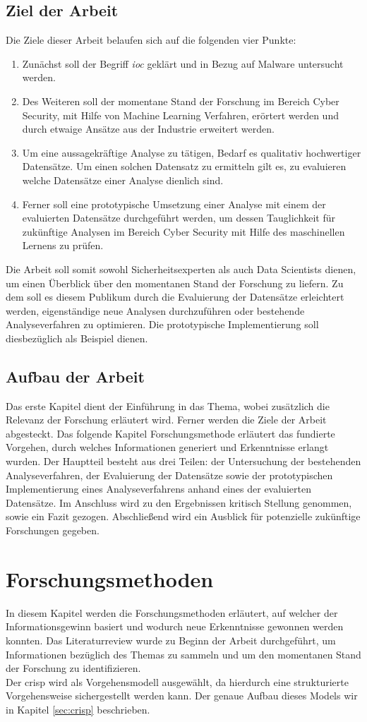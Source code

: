 \documentclass[
    12pt, %
    DIV10,
    ngerman, %
    a4paper, %
    oneside, %
    titlepage, %
    parskip=half, %
    headings=normal, %
    listof=totoc, %
    bibliography=totoc, %
    index=totoc, %
    captions=tableheading, %
    final %
]{scrreprt}
\begin{document}
\section{Ziel der Arbeit}
Die Ziele dieser Arbeit belaufen sich auf die folgenden vier Punkte:
\begin{enumerate}
\item Zunächst soll der Begriff \emph{\acl{ioc}} geklärt und in Bezug auf Malware untersucht werden. 
\item Des Weiteren soll der momentane Stand der Forschung im Bereich Cyber Security, mit Hilfe von Machine Learning Verfahren, erörtert werden und durch etwaige Ansätze aus der Industrie erweitert werden.
\item Um eine aussagekräftige Analyse zu tätigen, Bedarf es qualitativ hochwertiger Datensätze. Um einen solchen Datensatz zu ermitteln gilt es, zu evaluieren welche Datensätze einer Analyse dienlich sind.
\item Ferner soll eine prototypische Umsetzung einer Analyse mit einem der evaluierten Datensätze durchgeführt werden, um dessen Tauglichkeit für zukünftige Analysen im Bereich Cyber Security mit Hilfe des maschinellen Lernens zu prüfen.
\end{enumerate}
Die Arbeit soll somit sowohl Sicherheitsexperten als auch Data Scientists dienen, um einen Überblick über den momentanen Stand der Forschung zu liefern. Zu dem soll es diesem Publikum durch die Evaluierung der Datensätze erleichtert werden, eigenständige neue Analysen durchzuführen oder bestehende Analyseverfahren zu optimieren. Die prototypische Implementierung soll diesbezüglich als Beispiel dienen.
\section{Aufbau der Arbeit}
Das erste Kapitel dient der Einführung in das Thema, wobei zusätzlich die Relevanz der Forschung erläutert wird. Ferner werden die Ziele der Arbeit abgesteckt. Das folgende Kapitel Forschungsmethode erläutert das fundierte Vorgehen, durch welches Informationen generiert und Erkenntnisse erlangt wurden. Der Hauptteil besteht aus drei Teilen: der Untersuchung der bestehenden Analyseverfahren, der Evaluierung der Datensätze sowie der prototypischen Implementierung eines Analyseverfahrens anhand eines der evaluierten Datensätze. Im Anschluss wird zu den  Ergebnissen kritisch Stellung genommen, sowie ein Fazit gezogen. Abschlie{\ss}end wird ein Ausblick für potenzielle zukünftige Forschungen gegeben.
\chapter{Forschungsmethoden}
In diesem Kapitel werden die Forschungsmethoden erläutert, auf welcher der Informationsgewinn basiert und wodurch neue Erkenntnisse gewonnen werden konnten. Das Literaturreview wurde zu Beginn der Arbeit durchgeführt, um Informationen bezüglich des Themas zu sammeln und um den momentanen Stand der Forschung zu identifizieren.\\
Der \ac{crisp} wird als Vorgehensmodell ausgewählt, da hierdurch eine strukturierte Vorgehensweise sichergestellt werden kann. Der genaue Aufbau dieses Models wir in Kapitel \ref{sec:crisp} beschrieben.
\end{document}
